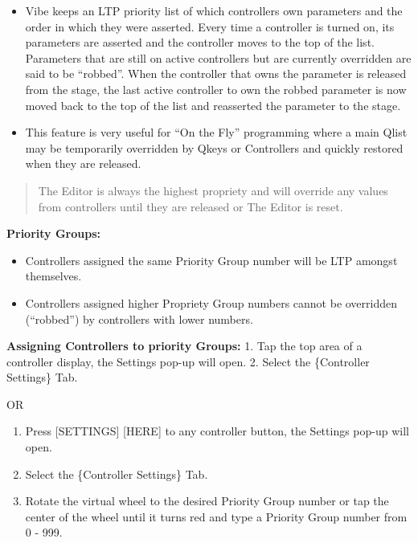 \documentclass[
]{article}
\providecommand{\tightlist}{%
  \setlength{\itemsep}{0pt}\setlength{\parskip}{0pt}}
\begin{document}
\begin{itemize}
\item
  Vibe keeps an LTP priority list of which controllers own parameters and the order in which they were asserted. Every time a controller is turned on, its parameters are asserted and the controller moves to the top of the list. Parameters that are still on active controllers but are currently overridden are said to be ``robbed''. When the controller that owns the parameter is released from the stage, the last active controller to own the robbed parameter is now moved back to the top of the list and reasserted the parameter to the stage.
\item
  This feature is very useful for ``On the Fly'' programming where a main Qlist may be temporarily overridden by Qkeys or Controllers and quickly restored when they are released.
\end{itemize}

\begin{quote}
{The Editor is always the highest propriety and will override any values from controllers until they are released or The Editor is reset}.
\end{quote}

\textbf{Priority Groups:}

\begin{itemize}
\item
  Controllers assigned the same Priority Group number will be LTP amongst themselves.
\item
  Controllers assigned higher Propriety Group numbers cannot be overridden (``robbed'') by controllers with lower numbers.
\end{itemize}

\textbf{Assigning Controllers to priority Groups:}
1. Tap the top area of a controller display, the Settings pop-up will open.
2. Select the \{Controller Settings\} Tab.

OR

\begin{enumerate}
\def\labelenumi{\arabic{enumi}.}
\tightlist
\item
  Press {[}SETTINGS{]} {[}HERE{]} to any controller button, the Settings pop-up will open.
\item
  Select the \{Controller Settings\} Tab.
\item
  Rotate the virtual wheel to the desired Priority Group number or tap the center of the wheel until it turns red and type a Priority Group number from 0 - 999.
\end{enumerate}
\end{document}

